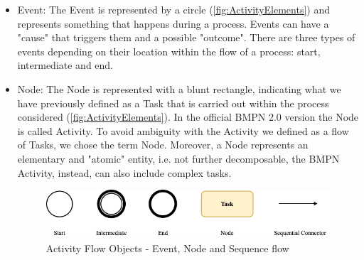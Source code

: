 \begin{itemize}
    \item Event: The Event is represented by a circle (\autoref{fig:ActivityElements}) and represents something that happens during a process. Events can have a "cause" that triggers them and a possible "outcome". There are three types of events depending on their location within the flow of a process: start, intermediate and end.
    \item Node: The Node is represented with a blunt rectangle, indicating what we have previously defined as a Task that is carried out within the process considered (\autoref{fig:ActivityElements}). In the official BMPN 2.0 version the Node is called Activity. To avoid ambiguity with the Activity we defined as a flow of Tasks, we chose the term Node. Moreover, a Node represents an elementary and "atomic" entity, i.e. not further decomposable, the BMPN Activity, instead, can also include complex tasks.
    \begin{figure}[H]
	\centering
	\includegraphics[width=12cm]{Figures/Conceptual Model/ActivityElements.png}
	\caption{Activity Flow Objects - Event, Node and Sequence flow}
	\label{fig:ActivityElements}
    \end{figure}


\end{itemize}
